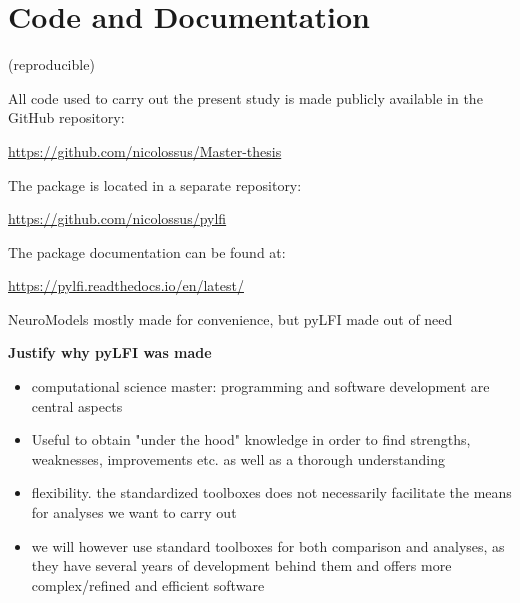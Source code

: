 \section{Code and Documentation}

(reproducible)

All code used to carry out the present study is made publicly available in the GitHub repository:

\begin{center}
    \url{https://github.com/nicolossus/Master-thesis}
\end{center}


The  package is located in a separate repository:

\begin{center}
    \url{https://github.com/nicolossus/pylfi}
\end{center}

The  package documentation can be found at:

\begin{center}
    \url{https://pylfi.readthedocs.io/en/latest/}
\end{center}

NeuroModels mostly made for convenience, but pyLFI made out of need

\textbf{Justify why pyLFI was made} 

\begin{itemize}
    \item computational science master: programming and software development are central aspects
    \item Useful to obtain "under the hood" knowledge in order to find strengths, weaknesses, improvements etc. as well as a thorough understanding 
    \item flexibility. the standardized toolboxes does not necessarily facilitate the means for analyses we want to carry out 
    \item we will however use standard toolboxes for both comparison and analyses, as they have several years of development behind them and offers more complex/refined and efficient software
\end{itemize} 

